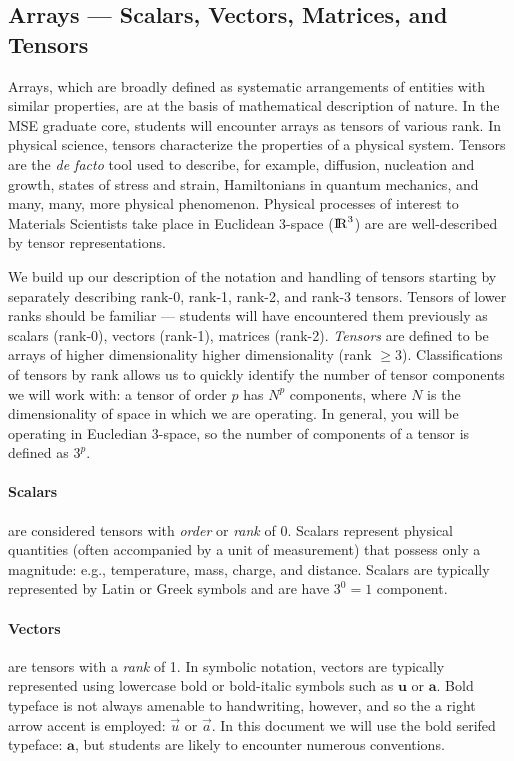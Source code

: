 \subsection{Arrays --- Scalars, Vectors, Matrices, and Tensors}

Arrays, which are broadly defined as systematic arrangements of entities with similar properties, are at the basis of mathematical description of nature. In the MSE graduate core, students will encounter arrays as tensors of various rank. In physical science, tensors characterize the properties of a physical system. Tensors are the \textit{de facto} tool used to describe, for example, diffusion, nucleation and growth, states of stress and strain, Hamiltonians in quantum mechanics, and many, many, more physical phenomenon. Physical processes of interest to Materials Scientists take place in Euclidean 3-space (${\rm I\!R}^3$) are are well-described by tensor representations.

We build up our description of the notation and handling of tensors starting by separately describing rank-0, rank-1, rank-2, and rank-3 tensors. Tensors of lower ranks should be familiar --- students will have encountered them previously as scalars (rank-0), vectors (rank-1), matrices (rank-2). \emph{Tensors} are defined to be arrays of higher dimensionality higher dimensionality (rank $\geq3$). Classifications of tensors by  rank allows us to quickly identify the number of tensor components we will work with: a tensor of order $p$ has $N^p$ components, where $N$ is the dimensionality of space in which we are operating. In general, you will be operating in Eucledian 3-space, so the number of components of a tensor is defined as $3^p$. 

\paragraph{Scalars}are considered tensors with \emph{order} or \emph{rank} of 0. Scalars represent physical quantities (often accompanied by a unit of measurement) that possess only a magnitude: e.g., temperature, mass, charge, and distance. Scalars are typically represented by Latin or Greek symbols and are have $3^{0} = 1$ component.

\paragraph{Vectors}are tensors with a \emph{rank} of 1. In symbolic notation, vectors are typically represented using lowercase bold or bold-italic symbols such as $\mathbf{u}$ or $\pmb{a}$. Bold typeface is not always amenable to handwriting, however, and so the a right arrow accent is employed: $\vec{u}$ or $\vec{a}$.  In this document we will use the bold serifed typeface: $\mathbf{a}$, but students are likely to encounter numerous conventions.

